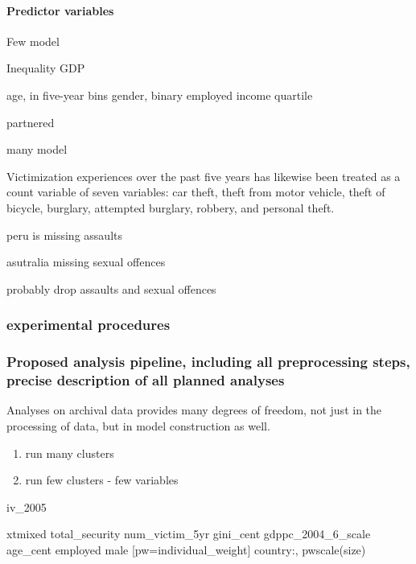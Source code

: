 \documentclass[
  english,
  man]{apa6}
\providecommand{\tightlist}{%
  \setlength{\itemsep}{0pt}\setlength{\parskip}{0pt}}
\let\oldparagraph\paragraph
\renewcommand{\paragraph}[1]{\oldparagraph{#1}\mbox{}}
\begin{document}
\hypertarget{predictor-variables}{%
\paragraph{Predictor variables}\label{predictor-variables}}

Few model

Inequality GDP

age, in five-year bins gender, binary employed income quartile

partnered

many model

Victimization experiences over the past five years has likewise been treated as a count variable of seven variables: car theft, theft from motor vehicle, theft of bicycle, burglary, attempted burglary, robbery, and personal theft.

peru is missing assaults

asutralia missing sexual offences

probably drop assaults and sexual offences

\hypertarget{experimental-procedures}{%
\subsubsection{experimental procedures}\label{experimental-procedures}}

\hypertarget{proposed-analysis-pipeline-including-all-preprocessing-steps-precise-description-of-all-planned-analyses}{%
\subsubsection{Proposed analysis pipeline, including all preprocessing steps, precise description of all planned analyses}\label{proposed-analysis-pipeline-including-all-preprocessing-steps-precise-description-of-all-planned-analyses}}

Analyses on archival data provides many degrees of freedom, not just in the processing of data, but in model construction as well.

\begin{enumerate}
\def\labelenumi{\arabic{enumi}.}
\tightlist
\item
  run many clusters
\item
  run few clusters - few variables
\end{enumerate}

iv\_2005

xtmixed total\_security num\_victim\_5yr gini\_cent gdppc\_2004\_6\_scale age\_cent employed male {[}pw=individual\_weight{]} \textbar\textbar{} country:, pwscale(size)
\end{document}
